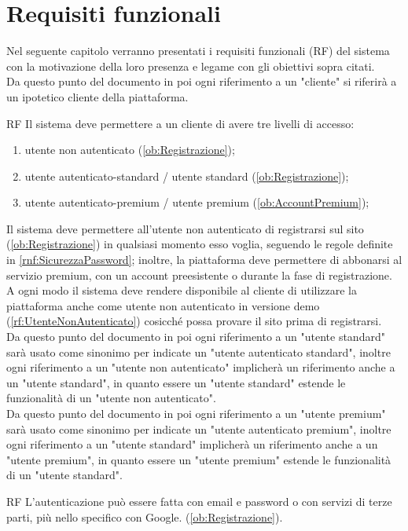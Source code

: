 \section{Requisiti funzionali}
\label{sec:RequisitiFunzionali}
Nel seguente capitolo verranno presentati i requisiti funzionali (RF) del sistema con la motivazione della loro presenza e legame con gli obiettivi sopra citati.\\
Da questo punto del documento in poi ogni riferimento a un "cliente" si riferirà a un ipotetico cliente della piattaforma.
\begin{listaPersonale}{RF}
	 Il sistema deve permettere a un cliente di avere tre livelli di accesso:
	\begin{enumerate}
		\item utente non autenticato (\ref{ob:Registrazione});
		\item utente autenticato-standard / utente standard (\ref{ob:Registrazione});
		\item utente autenticato-premium / utente premium (\ref{ob:AccountPremium});
	\end{enumerate}
	Il sistema deve permettere all'utente non autenticato di registrarsi sul sito (\ref{ob:Registrazione}) in qualsiasi momento esso voglia, seguendo le regole definite in \ref{rnf:SicurezzaPassword}; inoltre, la piattaforma deve permettere di abbonarsi al servizio premium, con un account preesistente o durante la fase di registrazione.\\
	A ogni modo il sistema deve rendere disponibile al cliente di utilizzare la piattaforma anche come utente non autenticato in versione demo (\ref{rf:UtenteNonAutenticato}) cosicché possa provare il sito prima di registrarsi.\\
	Da questo punto del documento in poi ogni riferimento a un "utente standard" sarà usato come sinonimo per indicate un "utente autenticato standard", inoltre ogni riferimento a un "utente non autenticato" implicherà un riferimento anche a un "utente standard", in quanto essere un "utente standard" estende le funzionalità di un "utente non autenticato".\\
	Da questo punto del documento in poi ogni riferimento a un "utente premium" sarà usato come sinonimo per indicate un "utente autenticato premium", inoltre ogni riferimento a un "utente standard" implicherà un riferimento anche a un "utente premium", in quanto essere un "utente premium" estende le funzionalità di un "utente standard".
	\begin{listaPersonale2}{RF}
		 L'autenticazione può essere fatta con email e password o con servizi di terze parti, più nello specifico con Google. (\ref{ob:Registrazione}).
	\end{listaPersonale2}


\end{listaPersonale}
